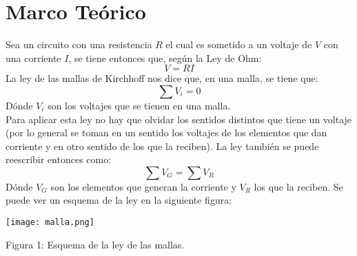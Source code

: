 \documentclass{article}
\begin{document}
\section{Marco Te\'orico}
Sea un circuito con una resistencia $R$ el cual es sometido a un voltaje de $V$ con una corriente $I$, se tiene entonces que, seg\'un la Ley de Ohm:
\begin{equation}
V=RI
\end{equation}
La ley de las mallas de Kirchhoff nos dice que, en una malla, se tiene que:
\begin{equation}
\sum V_i=0
\end{equation}
D\'onde $V_i$ son los voltajes que se tienen en una malla. \\ 
Para aplicar esta ley no hay que olvidar los sentidos distintos que tiene un voltaje (por lo general se toman en un sentido los voltajes de los elementos que dan corriente y en otro sentido de los que la reciben). La ley tambi\'en se puede reescribir entonces como:
\begin{equation}
\sum V_G=\sum V_R
\end{equation}
D\'onde $V_G$ son los elementos que generan la corriente y $V_R$ los que la reciben.
Se puede ver un esquema de la ley en la siguiente figura:
\begin{center}
\texttt{[image: malla.png]}
\end{center}
\begin{center}
Figura 1: Esquema de la ley de las mallas.
\end{center}
\end{document}

